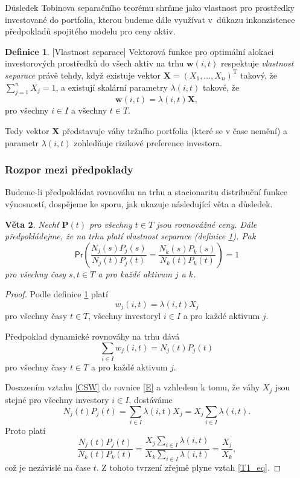\documentclass[a4paper,12pt]{report}
\newtheorem{veta}{Věta}
\theoremstyle{definition} \newtheorem{definice}[veta]{Definice}
\theoremstyle{remark}
\begin{document}
Důsledek Tobinova separačního teorému shrňme jako vlastnost pro prostředky investované do portfolia, kterou budeme dále využívat v~důkazu inkonzistence předpokladů spojitého modelu pro ceny aktiv.
\begin{definice}\label{vlastnost_separace}[Vlastnost separace]
Vektorová funkce pro optimální alokaci investorových prostředků do všech aktiv na trhu $\boldsymbol{w}(i,t)$ respektuje \textit{vlastnost separace} právě tehdy, když existuje vektor $\boldsymbol{X}=(X_1,\dots,X_n)^\mathrm{T}$ takový, že $\sum_{j=1}^nX_j=1$, a existují skalární parametry $\lambda(i,t)$ takové, že
$$\boldsymbol{w}(i,t)=\lambda(i,t)\boldsymbol{X},$$
pro všechny $i\in I$ a všechny $t\in T$.
\end{definice}
Tedy vektor $\boldsymbol{X}$ představuje váhy tržního portfolia (které se v čase nemění) a parametr $\lambda(i,t)$ zohledňuje rizikové preference investora.

\subsubsection{Rozpor mezi předpoklady}
Budeme-li předpokládat rovnováhu na trhu a stacionaritu distribuční funkce výnosností, dospějeme ke sporu, jak ukazuje následující věta a důsledek.

\begin{veta} \label{T1}
Nechť $\boldsymbol{P}(t)$ pro všechny $t\in T$  jsou rovnovážné ceny.
Dále předpokládejme, že na trhu platí vlastnost separace (definice \ref{vlastnost_separace}).
Pak
\begin{equation}\label{T1_eq}
\mathsf{Pr}\left(\frac{N_j(s)P_j(s)}{N_j(t)P_j(t)}=\frac{N_k(s)P_k(s)}{N_k(t)P_k(t)}\right)=1
\end{equation}
pro všechny časy $s,t\in T$  a pro každé aktivum $j$ a $k$.
\end{veta}

\begin{proof}
Podle definice \ref{vlastnost_separace} platí
\begin{equation}\label{CSW}
w_j(i,t)=\lambda(i,t)X_j
\end{equation}
pro všechny časy $t\in T$, všechny investoryl $i\in I$ a pro každé aktivum $j$.

Předpoklad dynamické rovnováhy na trhu dává
\begin{equation}\label{E}
\sum_{i\in I} w_{j}(i,t)=N_j(t)P_j(t)
\end{equation}
pro všechny časy $t\in T$ a pro každé aktivum $j$.

Dosazením vztahu \eqref{CSW} do rovnice \eqref{E} a vzhledem k tomu, že váhy $X_j$ jsou stejné pro všechny investory $i\in I$, dostáváme
$$N_j(t)P_j(t)=\sum_{i\in I}\lambda(i,t)X_j=X_j\sum_{i\in I}\lambda(i,t).$$
Proto platí
$$\frac{N_j(t)P_j(t)}{N_k(t)P_k(t)}=\frac{X_j\sum_{i\in I}\lambda(i,t)}{X_k\sum_{i\in I}\lambda(i,t)}=\frac{X_j}{X_k},$$
což je nezávislé na čase $t$.         
Z tohoto tvrzení zřejmě plyne vztah \eqref{T1_eq}.
\end{proof}
\end{document}
